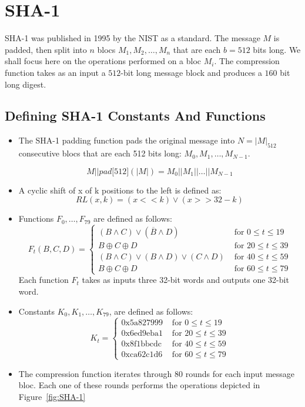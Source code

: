 \section{SHA-1}
\textsc{SHA-1} was published in 1995 by the NIST as a standard.
The message $M$ is padded, then split into $n$ blocs $M_1, M_2, {\ldots} ,M_n$ that are each $b=512$ bits long.
We shall focus here on the operations performed on a bloc $M_i$.
The compression function takes as an input a $512$-bit long message block and produces a $160$ bit long digest.

\subsection{Defining SHA-1 Constants And Functions}

\begin{itemize}
\item The \textsc{SHA-1} padding function pads the original message into $N=\vert M\vert_{512}$ consecutive blocs that are each 512 bits long: $M_0, M_1,{\ldots}, M_{N−1}$.

$$ M\vert \vert pad\lbrack 512\rbrack (\vert M\vert ) = M_0 \vert \vert M_1 \vert \vert \ldots \vert \vert M_{N-1}$$
\item A cyclic shift of x of k positions to the left is defined as:
$$RL(x,k)=(x<<k)\lor (x>>32-k)$$

\item Functions $F_0, {\ldots}, F_{79}$ are defined as follows:
\begin{equation}
F_t(B,C,D) =
\begin{cases}
(B \wedge C)  \vee (\overline{B} \wedge D) & \mbox{ for }0 \le t \le 19 \\
B \oplus C \oplus D & \mbox{ for } 20 \le t \le 39 \\
(B \wedge C)  \vee (B \wedge D)  \vee (C \wedge D) & \mbox{ for }40\le t\le 59 \\ 
B \oplus C \oplus D & \mbox{ for }60\le t\le 79 
\end{cases}
\end{equation}
Each function $F_t$ takes as inputs three 32-bit words and outputs one 32-bit word.

\item Constants $K_0, K_1, {\ldots}, K_{79}$, are defined as follows:
\begin{equation}
K_t =
\begin{cases}
\mbox{0x5a827999} & \mbox{ for }0 \le t \le 19 \\
\mbox{0x6ed9eba1} & \mbox{ for }20 \le t\le 39 \\ 
\mbox{0x8f1bbcdc} & \mbox{ for }40\le t\le 59 \\ 
\mbox{0xca62c1d6} & \mbox{ for }60\le t\le 79 
\end{cases}
\end{equation}
 \item The compression function iterates through 80 rounds for each input message bloc. Each one of these rounds performs the operations depicted in Figure~\ref{fig:SHA-1}
\end{itemize}


